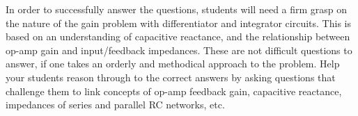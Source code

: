 





In order to successfully answer the questions, students will need a firm grasp on the nature of the gain problem with differentiator and integrator circuits.  This is based on an understanding of capacitive reactance, and the relationship between op-amp gain and input/feedback impedances.  These are not difficult questions to answer, if one takes an orderly and methodical approach to the problem.  Help your students reason through to the correct answers by asking questions that challenge them to link concepts of op-amp feedback gain, capacitive reactance, impedances of series and parallel RC networks, etc.




